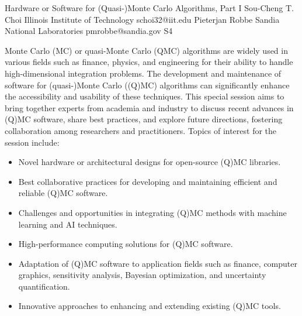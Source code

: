 

\clearpage

\begin{session}
 {Hardware or Software for (Quasi-)Monte Carlo Algorithms, Part I}%
 {Sou-Cheng T. Choi}%
 {Illinois Institute of Technology}%
 {schoi32@iit.edu}%
 {Pieterjan Robbe}%
 {Sandia National Laboratories}%
 {pmrobbe@sandia.gov}%
 {S4}%
 {}%

 Monte Carlo (MC) or quasi-Monte Carlo (QMC) algorithms are widely used in various fields such as finance, physics, and engineering for their ability to handle high-dimensional integration problems. The development and maintenance of software for (quasi-)Monte Carlo ((Q)MC) algorithms can significantly enhance the accessibility and usability of these techniques. This special session aims to bring together experts from academia and industry to discuss recent advances in (Q)MC software, share best practices, and explore future directions, fostering collaboration among researchers and practitioners.
 Topics of interest for the session include:
 \begin{itemize}
 \item Novel hardware or architectural designs for open-source (Q)MC libraries.
 \item Best collaborative practices for developing and maintaining efficient and reliable (Q)MC software.
 \item Challenges and opportunities in integrating (Q)MC methods with machine learning and AI techniques.
 \item High-performance computing solutions for (Q)MC software.
 \item Adaptation of (Q)MC software to application fields such as finance, computer graphics, sensitivity analysis, Bayesian optimization, and uncertainty quantification.
 \item Innovative approaches to enhancing and extending existing (Q)MC tools.
 \end{itemize}
\end{session}

